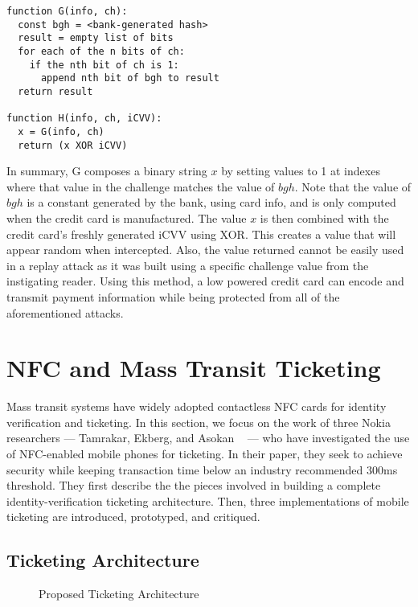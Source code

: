 \documentclass{sig-alternate}
\begin{document}
\begin{lstlisting}
function G(info, ch):
  const bgh = <bank-generated hash>
  result = empty list of bits
  for each of the n bits of ch:
    if the nth bit of ch is 1:
      append nth bit of bgh to result
  return result

function H(info, ch, iCVV):
  x = G(info, ch)
  return (x XOR iCVV)
\end{lstlisting}

In summary, G composes a binary string $x$ by setting values to 1 at indexes where that value in the challenge matches the value of $bgh$. Note that the value of $bgh$ is a constant generated by the bank, using card info, and is only computed when the credit card is manufactured. The value $x$ is then combined with the credit card's freshly generated iCVV using XOR. This creates a value that will appear random when intercepted. Also, the value returned cannot be easily used in a replay attack as it was built using a specific challenge value from the instigating reader. Using this method, a low powered credit card can encode and transmit payment information while being protected from all of the aforementioned attacks.




\section{NFC and Mass Transit Ticketing}
\label{sec:mobile}

Mass transit systems have widely adopted contactless NFC cards for identity verification and ticketing. In this section, we focus on the work of three Nokia researchers --- Tamrakar, Ekberg, and Asokan ~\cite{Ticket2011} --- who have investigated the use of NFC-enabled mobile phones for ticketing. In their paper, they seek to achieve security while keeping transaction time below an industry recommended 300ms threshold.
They first describe the the pieces involved in building a complete identity-verification ticketing architecture. Then, three implementations of mobile ticketing are introduced, prototyped, and critiqued.~\cite{Ticket2011}

\subsection{Ticketing Architecture}
\begin{figure}
\centering
{}
\caption{Proposed Ticketing Architecture~\cite{Ticket2011}}
\label{fig:ticketingArch}
\end{figure}
\end{document}
